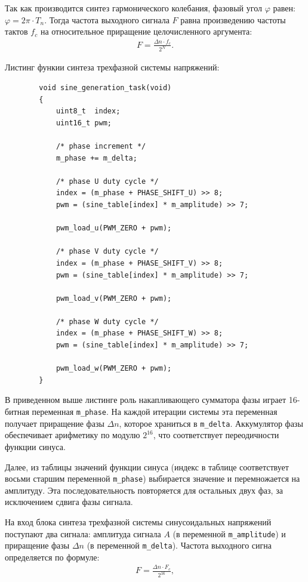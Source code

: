         Так как производится синтез гармонического колебания, фазовый угол
        $\varphi$ равен: $\varphi = 2\pi \cdot T_n$. Тогда частота выходного
        сигнала $F$ равна произведению частоты тактов $f_c$ на относительное
        приращение целочисленного аргумента:
        \begin{gather*}
            F = \frac{\Delta n \cdot f_c}{2^N}.
        \end{gather*}

        Листинг функии синтеза трехфазной системы напряжений:
        \begin{verbatim}
        void sine_generation_task(void)
        {
            uint8_t  index;
            uint16_t pwm;

            /* phase increment */
            m_phase += m_delta;
         
            /* phase U duty cycle */
            index = (m_phase + PHASE_SHIFT_U) >> 8;
            pwm = (sine_table[index] * m_amplitude) >> 7;

            pwm_load_u(PWM_ZERO + pwm);

            /* phase V duty cycle */
            index = (m_phase + PHASE_SHIFT_V) >> 8;
            pwm = (sine_table[index] * m_amplitude) >> 7;

            pwm_load_v(PWM_ZERO + pwm);

            /* phase W duty cycle */
            index = (m_phase + PHASE_SHIFT_W) >> 8;
            pwm = (sine_table[index] * m_amplitude) >> 7;

            pwm_load_w(PWM_ZERO + pwm);
        }
        \end{verbatim}

        В приведенном выше листинге роль накапливающего сумматора фазы играет
        16-битная переменная \verb"m_phase". На каждой итерации системы эта
        переменная получает приращение фазы $\Delta n$, которое храниться в
        \verb"m_delta". Аккумулятор фазы обеспечивает арифметику по модулю
        $2^{16}$, что соответствует переодичности функции синуса.

        Далее, из таблицы значений функции синуса (индекс в таблице
        соответствует восьми старшим переменной \verb"m_phase") выбирается
        значение и перемножается на амплитуду. Эта последовательность
        повторяется для остальных двух фаз, за исключением сдвига фазы сигнала.

        На вход блока синтеза трехфазной системы синусоидальных напряжений
        поступают два сигнала: амплитуда сигнала $A$ (в переменной
        \verb"m_amplitude") и приращение фазы $\Delta n$ (в переменной
        \verb"m_delta"). Частота выходного сигна определяется по формуле:
        \begin{gather*}
            F = \frac{\Delta n \cdot F_c}{2^{16}},
        \end{gather*}


